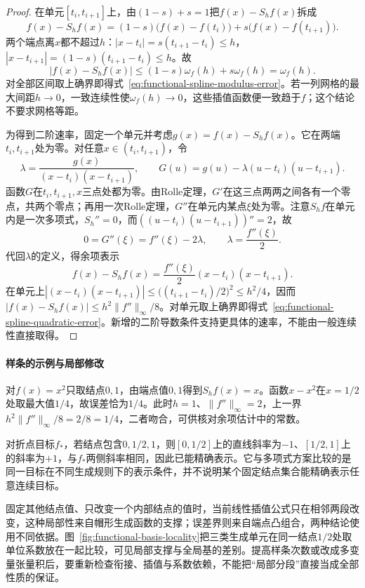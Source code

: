 \begin{proof}
在单元$[t_i,t_{i+1}]$上，由$(1-s)+s=1$把$f(x)-S_hf(x)$拆成
\[
  f(x)-S_hf(x)=(1-s)\bigl(f(x)-f(t_i)\bigr)+s\bigl(f(x)-f(t_{i+1})\bigr).
\]
两个端点离$x$都不超过$h$：$|x-t_i|=s(t_{i+1}-t_i)\le h$，$|x-t_{i+1}|=(1-s)(t_{i+1}-t_i)\le h$。故
\[
  |f(x)-S_hf(x)|\le(1-s)\omega_f(h)+s\omega_f(h)=\omega_f(h).
\]
对全部区间取上确界即得式~\eqref{eq:functional-spline-modulus-error}。若一列网格的最大间距$h\to0$，一致连续性使$\omega_f(h)\to0$，这些插值函数便一致趋于$f$；这个结论不要求网格等距。

为得到二阶速率，固定一个单元并考虑$g(x)=f(x)-S_hf(x)$。它在两端$t_i,t_{i+1}$处为零。对任意$x\in(t_i,t_{i+1})$，令
\[
  \lambda=\frac{g(x)}{(x-t_i)(x-t_{i+1})},
  \qquad
  G(u)=g(u)-\lambda(u-t_i)(u-t_{i+1}).
\]
函数$G$在$t_i,t_{i+1},x$三点处都为零。由Rolle定理，$G'$在这三点两两之间各有一个零点，共两个零点；再用一次Rolle定理，$G''$在单元内某点$\xi$处为零。注意$S_hf$在单元内是一次多项式，$S_h''=0$，而$((u-t_i)(u-t_{i+1}))''=2$，故
\[
  0=G''(\xi)=f''(\xi)-2\lambda,
  \qquad
  \lambda=\frac{f''(\xi)}2.
\]
代回$\lambda$的定义，得余项表示
\[
  f(x)-S_hf(x)=\frac{f''(\xi)}2(x-t_i)(x-t_{i+1}).
\]
在单元上$|(x-t_i)(x-t_{i+1})|\le\bigl((t_{i+1}-t_i)/2\bigr)^2\le h^2/4$，因而$|f(x)-S_hf(x)|\le h^2\|f''\|_\infty/8$。对单元取上确界即得式~\eqref{eq:functional-spline-quadratic-error}。新增的二阶导数条件支持更具体的速率，不能由一般连续性直接取得。
\end{proof}

\paragraph{样条的示例与局部修改}

\begin{example}[二次函数的两段插值]
对$f(x)=x^2$只取结点$0,1$，由端点值$0,1$得到$S_hf(x)=x$。函数$x-x^2$在$x=1/2$处取最大值$1/4$，故误差恰为$1/4$。此时$h=1$、$\|f''\|_\infty=2$，上一界$h^2\|f''\|_\infty/8=2/8=1/4$，二者吻合，可供核对余项估计中的常数。
\end{example}

对折点目标$f_*$，若结点包含$0,1/2,1$，则$[0,1/2]$上的直线斜率为$-1$、$[1/2,1]$上的斜率为$+1$，与$f_*$两侧斜率相同，因此已能精确表示。它与多项式方案比较的是同一目标在不同生成规则下的表示条件，并不说明某个固定结点集合能精确表示任意连续目标。

固定其他结点值、只改变一个内部结点的值时，当前线性插值公式只在相邻两段改变，这种局部性来自帽形生成函数的支撑；误差界则来自端点凸组合，两种结论使用不同依据。图~\ref{fig:functional-basis-locality}把三类生成单元在同一结点$1/2$处取单位系数放在一起比较，可见局部支撑与全局基的差别。提高样条次数或改成多变量张量积后，要重新检查衔接、插值与系数依赖，不能把“局部分段”直接当成全部性质的保证。


